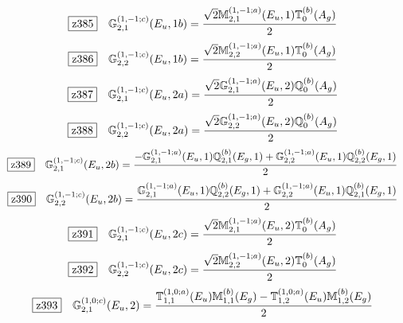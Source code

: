 \documentclass[fleqn,10pt,landscape]{jsarticle}
\begin{document}
\begin{dmath*}
\hspace*{3mm}\fbox{z385}\quad \mathbb{G}_{2,1}^{(1,-1;c)}(E_{u},1b)=\frac{\sqrt{2} \mathbb{M}_{2,1}^{(1,-1;a)}(E_{u},1) \mathbb{T}_{0}^{(b)}(A_{g})}{2}
\end{dmath*}
\begin{dmath*}
\hspace*{3mm}\fbox{z386}\quad \mathbb{G}_{2,2}^{(1,-1;c)}(E_{u},1b)=\frac{\sqrt{2} \mathbb{M}_{2,2}^{(1,-1;a)}(E_{u},1) \mathbb{T}_{0}^{(b)}(A_{g})}{2}
\end{dmath*}
\begin{dmath*}
\hspace*{3mm}\fbox{z387}\quad \mathbb{G}_{2,1}^{(1,-1;c)}(E_{u},2a)=\frac{\sqrt{2} \mathbb{G}_{2,1}^{(1,-1;a)}(E_{u},2) \mathbb{Q}_{0}^{(b)}(A_{g})}{2}
\end{dmath*}
\begin{dmath*}
\hspace*{3mm}\fbox{z388}\quad \mathbb{G}_{2,2}^{(1,-1;c)}(E_{u},2a)=\frac{\sqrt{2} \mathbb{G}_{2,2}^{(1,-1;a)}(E_{u},2) \mathbb{Q}_{0}^{(b)}(A_{g})}{2}
\end{dmath*}
\begin{dmath*}
\hspace*{3mm}\fbox{z389}\quad \mathbb{G}_{2,1}^{(1,-1;c)}(E_{u},2b)=\frac{- \mathbb{G}_{2,1}^{(1,-1;a)}(E_{u},1) \mathbb{Q}_{2,1}^{(b)}(E_{g},1) + \mathbb{G}_{2,2}^{(1,-1;a)}(E_{u},1) \mathbb{Q}_{2,2}^{(b)}(E_{g},1)}{2}
\end{dmath*}
\begin{dmath*}
\hspace*{3mm}\fbox{z390}\quad \mathbb{G}_{2,2}^{(1,-1;c)}(E_{u},2b)=\frac{\mathbb{G}_{2,1}^{(1,-1;a)}(E_{u},1) \mathbb{Q}_{2,2}^{(b)}(E_{g},1) + \mathbb{G}_{2,2}^{(1,-1;a)}(E_{u},1) \mathbb{Q}_{2,1}^{(b)}(E_{g},1)}{2}
\end{dmath*}
\begin{dmath*}
\hspace*{3mm}\fbox{z391}\quad \mathbb{G}_{2,1}^{(1,-1;c)}(E_{u},2c)=\frac{\sqrt{2} \mathbb{M}_{2,1}^{(1,-1;a)}(E_{u},2) \mathbb{T}_{0}^{(b)}(A_{g})}{2}
\end{dmath*}
\begin{dmath*}
\hspace*{3mm}\fbox{z392}\quad \mathbb{G}_{2,2}^{(1,-1;c)}(E_{u},2c)=\frac{\sqrt{2} \mathbb{M}_{2,2}^{(1,-1;a)}(E_{u},2) \mathbb{T}_{0}^{(b)}(A_{g})}{2}
\end{dmath*}
\begin{dmath*}
\hspace*{3mm}\fbox{z393}\quad \mathbb{G}_{2,1}^{(1,0;c)}(E_{u},2)=\frac{\mathbb{T}_{1,1}^{(1,0;a)}(E_{u}) \mathbb{M}_{1,1}^{(b)}(E_{g}) - \mathbb{T}_{1,2}^{(1,0;a)}(E_{u}) \mathbb{M}_{1,2}^{(b)}(E_{g})}{2}
\end{dmath*}
\end{document}
